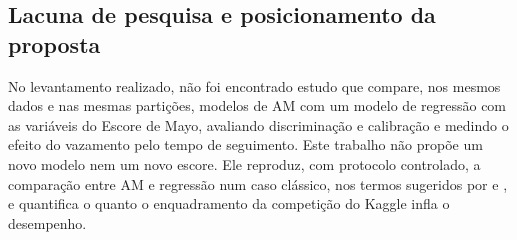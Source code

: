 \subsection{Lacuna de pesquisa e posicionamento da proposta}
No levantamento realizado, não foi encontrado estudo que compare, nos mesmos dados e nas mesmas partições, modelos de AM com um modelo de regressão com as variáveis do Escore de Mayo, avaliando discriminação e calibração e medindo o efeito do vazamento pelo tempo de seguimento. Este trabalho não propõe um novo modelo nem um novo escore. Ele reproduz, com protocolo controlado, a comparação entre AM e regressão num caso clássico, nos termos sugeridos por  e , e quantifica o quanto o enquadramento da competição do Kaggle infla o desempenho.
